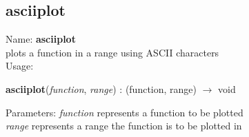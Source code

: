 \subsection{ asciiplot }
\noindent Name: \textbf{asciiplot}\\
plots a function in a range using ASCII characters\\

\noindent Usage: 
\begin{center}
\textbf{asciiplot}(\emph{function}, \emph{range}) : (\textsf{function}, \textsf{range}) $\rightarrow$ \textsf{void}\\
\end{center}
Parameters: 
\emph{function} represents a function to be plotted\\
\emph{range} represents a range the function is to be plotted in \\


